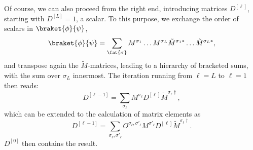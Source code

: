 Of course, we can also proceed from the right end, introducing matrices $D^{[\ell]}$, starting with
$D^{[L]}=1$, a scalar. To this purpose, we exchange the order of scalars in $\braket{\phi}{\psi}$,
\begin{equation}
\braket{\phi}{\psi} = \sum_{\fat{\sigma}}M^{\sigma_1} \ldots M^{\sigma_L}  \tilde{M}^{\sigma_1*} \ldots \tilde{M}^{\sigma_L*}  ,
\end{equation}
and transpose again the $\tilde{M}$-matrices, leading to a hierarchy of bracketed sums, with the sum over $\sigma_L$ innermost. The iteration running from $\ell=L$ to $\ell=1$ then reads:
\begin{equation}
D^{[\ell-1]} = \sum_{\sigma_\ell}  M^{\sigma_{\ell}} D^{[\ell]} \tilde{M}^{\sigma_{\ell}\dagger} ,
\end{equation}
which can be extended to the calculation of matrix elements as
\begin{equation}
D^{[\ell-1]} = \sum_{\sigma_\ell,\sigma'_\ell}  O^{\sigma_\ell,\sigma'_\ell} M^{\sigma'_{\ell}} D^{[\ell]} \tilde{M}^{\sigma_{\ell}\dagger} .
\end{equation}
$D^{[0]}$ then contains the result.

